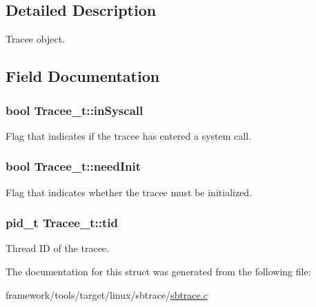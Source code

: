 \subsection{Detailed Description}
Tracee object. 

\subsection{Field Documentation}
\subsubsection[{\texorpdfstring{in\+Syscall}{inSyscall}}]{\setlength{\rightskip}{0pt plus 5cm}bool Tracee\+\_\+t\+::in\+Syscall}\hypertarget{struct_tracee__t_aa4ce91b02bfa65b9450c236f082bd60a}{}\label{struct_tracee__t_aa4ce91b02bfa65b9450c236f082bd60a}


Flag that indicates if the tracee has entered a system call. 

\subsubsection[{\texorpdfstring{need\+Init}{needInit}}]{\setlength{\rightskip}{0pt plus 5cm}bool Tracee\+\_\+t\+::need\+Init}\hypertarget{struct_tracee__t_ac7e5e2ea5dd53a5f9fd1a2904c322ed4}{}\label{struct_tracee__t_ac7e5e2ea5dd53a5f9fd1a2904c322ed4}


Flag that indicates whether the tracee must be initialized. 

\subsubsection[{\texorpdfstring{tid}{tid}}]{\setlength{\rightskip}{0pt plus 5cm}pid\+\_\+t Tracee\+\_\+t\+::tid}\hypertarget{struct_tracee__t_a423f0e6a8bff7c3710fb37fc17a4e24c}{}\label{struct_tracee__t_a423f0e6a8bff7c3710fb37fc17a4e24c}


Thread ID of the tracee. 



The documentation for this struct was generated from the following file\+:\begin{DoxyCompactItemize}
\item 
framework/tools/target/linux/sbtrace/\hyperlink{sbtrace_8c}{sbtrace.\+c}\end{DoxyCompactItemize}
